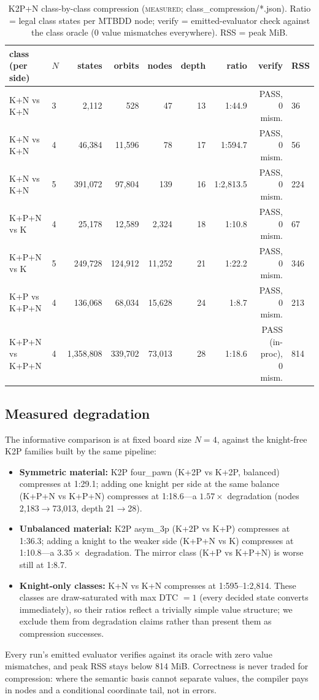 \documentclass[conference]{IEEEtran}
\newcommand{\tierm}{\textsc{measured}}
\begin{document}
\begin{table}[t]
\caption{K2P+N class-by-class compression (\tierm{}; class\_compression/*.json).
Ratio = legal class states per MTBDD node; verify = emitted-evaluator check
against the class oracle (0 value mismatches everywhere). RSS = peak MiB.}
\label{tab:classes}
\centering
\footnotesize
\begin{tabular}{llrrrrrrl}
\toprule
class (per side) & $N$ & states & orbits & nodes & depth & ratio & verify & RSS \\
\midrule
K+N vs K+N      & 3 & 2{,}112 & 528 & 47 & 13 & 1:44.9 & PASS, 0 mism. & 36 \\
K+N vs K+N      & 4 & 46{,}384 & 11{,}596 & 78 & 17 & 1:594.7 & PASS, 0 mism. & 56 \\
K+N vs K+N      & 5 & 391{,}072 & 97{,}804 & 139 & 16 & 1:2{,}813.5 & PASS, 0 mism. & 224 \\
K+P+N vs K      & 4 & 25{,}178 & 12{,}589 & 2{,}324 & 18 & 1:10.8 & PASS, 0 mism. & 67 \\
K+P+N vs K      & 5 & 249{,}728 & 124{,}912 & 11{,}252 & 21 & 1:22.2 & PASS, 0 mism. & 346 \\
K+P vs K+P+N    & 4 & 136{,}068 & 68{,}034 & 15{,}628 & 24 & 1:8.7 & PASS, 0 mism. & 213 \\
K+P+N vs K+P+N  & 4 & 1{,}358{,}808 & 339{,}702 & 73{,}013 & 28 & 1:18.6 & PASS (in-proc), 0 mism. & 814 \\
\bottomrule
\end{tabular}
\end{table}

\subsection{Measured degradation}
The informative comparison is at fixed board size $N{=}4$, against the
knight-free K2P families built by the same pipeline:
\begin{itemize}
\item \textbf{Symmetric material:} K2P four\_pawn (K+2P vs K+2P, balanced)
compresses at 1:29.1; adding one knight per side at the same balance
(K+P+N vs K+P+N) compresses at 1:18.6---a $1.57\times$ degradation
(nodes 2{,}183$\to$73{,}013, depth 21$\to$28).
\item \textbf{Unbalanced material:} K2P asym\_3p (K+2P vs K+P) compresses at
1:36.3; adding a knight to the weaker side (K+P+N vs K) compresses at
1:10.8---a $3.35\times$ degradation. The mirror class (K+P vs K+P+N) is
worse still at 1:8.7.
\item \textbf{Knight-only classes:} K+N vs K+N compresses at 1:595--1:2{,}814.
These classes are draw-saturated with max DTC $=1$ (every decided state
converts immediately), so their ratios reflect a trivially simple value
structure; we exclude them from degradation claims rather than present them
as compression successes.
\end{itemize}
Every run's emitted evaluator verifies against its oracle with zero value
mismatches, and peak RSS stays below 814 MiB. Correctness is never traded
for compression: where the semantic basis cannot separate values, the
compiler pays in nodes and a conditional coordinate tail, not in errors.
\end{document}
